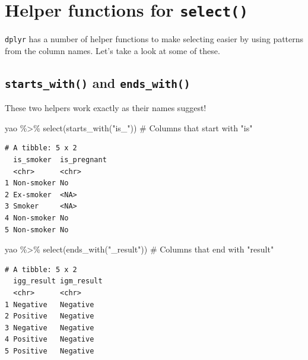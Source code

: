 \documentclass[
  letterpaper,
  DIV=11,
  numbers=noendperiod]{scrreprt}
\newenvironment{Shaded}{\begin{snugshade}}{\end{snugshade}}
\newcommand{\CommentTok}[1]{\textcolor[rgb]{0.37,0.37,0.37}{#1}}
\newcommand{\FunctionTok}[1]{\textcolor[rgb]{0.28,0.35,0.67}{#1}}
\newcommand{\NormalTok}[1]{\textcolor[rgb]{0.00,0.23,0.31}{#1}}
\newcommand{\SpecialCharTok}[1]{\textcolor[rgb]{0.37,0.37,0.37}{#1}}
\newcommand{\StringTok}[1]{\textcolor[rgb]{0.13,0.47,0.30}{#1}}
\begin{document}
\hypertarget{helper-functions-for-select}{%
\section{\texorpdfstring{Helper functions for
\texttt{select()}}{Helper functions for select()}}\label{helper-functions-for-select}}

\texttt{dplyr} has a number of helper functions to make selecting easier
by using patterns from the column names. Let's take a look at some of
these.

\hypertarget{starts_with-and-ends_with}{%
\subsection{\texorpdfstring{\texttt{starts\_with()} and
\texttt{ends\_with()}}{starts\_with() and ends\_with()}}\label{starts_with-and-ends_with}}

These two helpers work exactly as their names suggest!

\begin{Shaded}
\begin{Highlighting}[]
\NormalTok{yao }\SpecialCharTok{\%\textgreater{}\%} \FunctionTok{select}\NormalTok{(}\FunctionTok{starts\_with}\NormalTok{(}\StringTok{"is\_"}\NormalTok{)) }\CommentTok{\# Columns that start with "is"}
\end{Highlighting}
\end{Shaded}

\begin{verbatim}
# A tibble: 5 x 2
  is_smoker  is_pregnant
  <chr>      <chr>      
1 Non-smoker No         
2 Ex-smoker  <NA>       
3 Smoker     <NA>       
4 Non-smoker No         
5 Non-smoker No         
\end{verbatim}

\begin{Shaded}
\begin{Highlighting}[]
\NormalTok{yao }\SpecialCharTok{\%\textgreater{}\%} \FunctionTok{select}\NormalTok{(}\FunctionTok{ends\_with}\NormalTok{(}\StringTok{"\_result"}\NormalTok{)) }\CommentTok{\# Columns that end with "result"}
\end{Highlighting}
\end{Shaded}

\begin{verbatim}
# A tibble: 5 x 2
  igg_result igm_result
  <chr>      <chr>     
1 Negative   Negative  
2 Positive   Negative  
3 Negative   Negative  
4 Positive   Negative  
5 Positive   Negative  
\end{verbatim}
\end{document}
